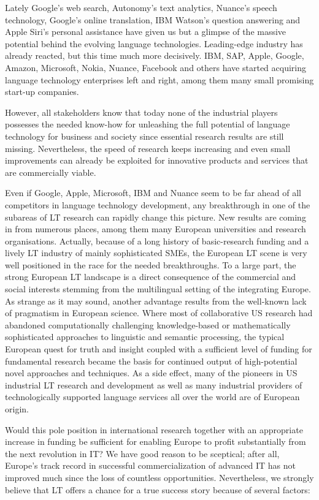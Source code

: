 \documentclass[10pt, plain]{../../metanetpaper}
\begin{document}
\begin{multicols}{2}
Lately Google’s web search, Autonomy’s text analytics, Nuance’s speech technology, Google’s online translation, IBM Watson’s question answering and Apple Siri’s personal assistance have given us but a glimpse of the massive potential behind the evolving language technologies. Leading-edge industry has already reacted, but this time much more decisively. IBM, SAP, Apple, Google, Amazon, Microsoft, Nokia, Nuance, Facebook and others have started acquiring language technology enterprises left and right, among them many small promising start-up companies.  

However, all stakeholders know that today none of the industrial players possesses the needed know-how for unleashing the full potential of language technology for business and society since essential research results are still missing. Nevertheless, the speed of research keeps increasing and even small improvements can already be exploited for innovative products and services that are commercially viable.

Even if Google, Apple, Microsoft, IBM and Nuance seem to be far ahead of all competitors in language technology development, any breakthrough in one of the subareas of LT research can rapidly change this picture. New results are coming in from numerous places, among them many European universities and research organisations. Actually, because of a long history of basic-research funding and a lively LT industry of mainly sophisticated SMEs, the European LT scene is very well positioned in the race for the needed breakthroughs. To a large part, the strong European LT landscape is a direct consequence of the commercial and social interests stemming from the multilingual setting of the integrating Europe. As strange as it may sound, another advantage results from the well-known lack of pragmatism in European science. Where most of collaborative US research had abandoned computationally challenging knowledge-based or mathematically sophisticated approaches to linguistic and semantic processing, the typical European quest for truth and insight coupled with a sufficient level of funding for fundamental research became the basis for continued output of high-potential novel approaches and techniques. As a side effect, many of the pioneers in US industrial LT research and development as well as many industrial providers of technologically supported language services all over the world are of European origin.  

Would this pole position in international research together with an appropriate increase in funding be sufficient for enabling Europe to profit substantially from the next revolution in IT? We have good reason to be sceptical; after all, Europe’s track record in successful commercialization of advanced IT has not improved much since the loss of countless opportunities. Nevertheless, we strongly believe that LT offers a chance for a true success story because of several factors:


\end{multicols}
\end{document}
